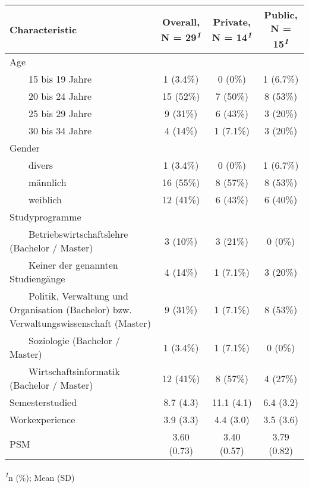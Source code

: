 \setlength{\LTpost}{0mm}
\begin{longtable}{lccc}
\toprule
\textbf{Characteristic} & \textbf{Overall}, N = 29\textsuperscript{\textit{1}} & \textbf{Private}, N = 14\textsuperscript{\textit{1}} & \textbf{Public}, N = 15\textsuperscript{\textit{1}} \\ 
\midrule\addlinespace[2.5pt]
Age &  &  &  \\ 
    15 bis 19 Jahre & 1 (3.4\%) & 0 (0\%) & 1 (6.7\%) \\ 
    20 bis 24 Jahre & 15 (52\%) & 7 (50\%) & 8 (53\%) \\ 
    25 bis 29 Jahre & 9 (31\%) & 6 (43\%) & 3 (20\%) \\ 
    30 bis 34 Jahre & 4 (14\%) & 1 (7.1\%) & 3 (20\%) \\ 
Gender &  &  &  \\ 
    divers & 1 (3.4\%) & 0 (0\%) & 1 (6.7\%) \\ 
    männlich & 16 (55\%) & 8 (57\%) & 8 (53\%) \\ 
    weiblich & 12 (41\%) & 6 (43\%) & 6 (40\%) \\ 
Studyprogramme &  &  &  \\ 
    Betriebswirtschaftslehre (Bachelor / Master) & 3 (10\%) & 3 (21\%) & 0 (0\%) \\ 
    Keiner der genannten Studiengänge & 4 (14\%) & 1 (7.1\%) & 3 (20\%) \\ 
    Politik, Verwaltung und Organisation (Bachelor) bzw. Verwaltungswissenschaft (Master) & 9 (31\%) & 1 (7.1\%) & 8 (53\%) \\ 
    Soziologie (Bachelor / Master) & 1 (3.4\%) & 1 (7.1\%) & 0 (0\%) \\ 
    Wirtschaftsinformatik (Bachelor / Master) & 12 (41\%) & 8 (57\%) & 4 (27\%) \\ 
Semesterstudied & 8.7 (4.3) & 11.1 (4.1) & 6.4 (3.2) \\ 
Workexperience & 3.9 (3.3) & 4.4 (3.0) & 3.5 (3.6) \\ 
PSM & 3.60 (0.73) & 3.40 (0.57) & 3.79 (0.82) \\ 
\bottomrule
\end{longtable}
\begin{minipage}{\linewidth}
\textsuperscript{\textit{1}}n (\%); Mean (SD)\\
\end{minipage}

